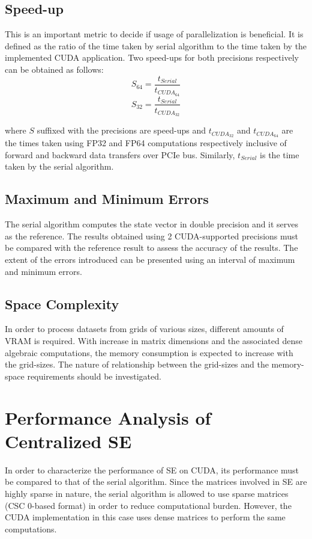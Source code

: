 \documentclass[thesis.tex]{subfiles}
\begin{document}
\subsection{Speed-up}
This is an important metric to decide if usage of parallelization is beneficial. It is defined as the ratio of the time taken by serial algorithm to the time taken by the implemented CUDA application. Two speed-ups for both precisions respectively can be obtained as follows:
\begin{equation*}
S_{64} = \frac{t_{Serial}}{t_{CUDA_{64}}}
\end{equation*}
\begin{equation*}
S_{32} = \frac{t_{Serial}}{t_{CUDA_{32}}}
\end{equation*}

where $S$ suffixed with the precisions are speed-ups and $t_{CUDA_{32}}$ and $t_{CUDA_{64}}$ are the times taken using FP32 and FP64 computations respectively inclusive of forward and backward data transfers over PCIe bus. Similarly, $t_{Serial}$ is the time taken by the serial algorithm.

\subsection{Maximum and Minimum Errors}\label{subsec:speedups}
The serial algorithm computes the state vector in double precision and it serves as the reference. The results obtained using 2 CUDA-supported precisions must be compared with the reference result to assess the accuracy of the results. The extent of the errors introduced can be presented using an interval of maximum and minimum errors.

\subsection{Space Complexity}
In order to process datasets from grids of various sizes, different amounts of VRAM is required. With increase in matrix dimensions and the associated dense algebraic computations, the memory consumption is expected to increase with the grid-sizes. The nature of relationship between the grid-sizes and the memory-space requirements should be investigated.


\section{Performance Analysis of Centralized SE}\label{sec:centPerf}
In order to characterize the performance of SE on CUDA, its performance must be compared to that of the serial algorithm. Since the matrices involved in SE are highly sparse in nature, the serial algorithm is allowed to use sparse matrices (CSC 0-based format) in order to reduce computational burden. However, the CUDA implementation in this case uses dense matrices to perform the same computations. 
\end{document}
